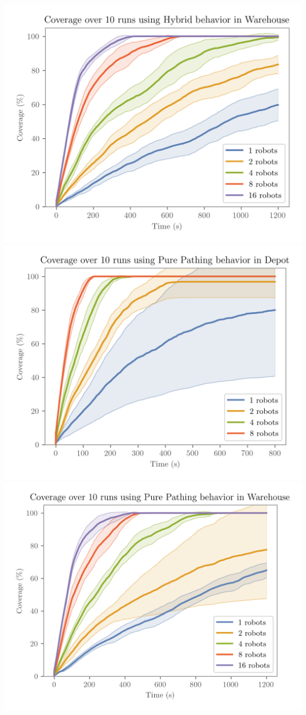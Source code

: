 \includegraphics[width=\w]{figures/plots/benchmarks/coverage-over-10-runs-using-hybrid-behavior-in-warehouse.png}
\\
\includegraphics[width=\w]{figures/plots/benchmarks/coverage-over-10-runs-using-pure-pathing-behavior-in-depot.png}
\includegraphics[width=\w]{figures/plots/benchmarks/coverage-over-10-runs-using-pure-pathing-behavior-in-warehouse.png}
